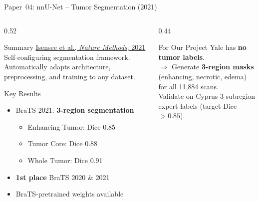 \documentclass[aspectratio=169,xcolor=dvipsnames]{beamer}
\begin{document}
\begin{frame}{Paper~04: nnU-Net -- Tumor Segmentation (2021)}
    \begin{columns}
        \begin{column}{0.52\textwidth}
            \begin{block}{Summary}
                \small
                \href{https://doi.org/10.1038/s41592-020-01008-z}{Isensee et al., \textit{Nature Methods}, 2021}\\[0.3em]
                Self-configuring segmentation framework. Automatically adapts architecture, preprocessing, and training to any dataset.
            \end{block}

            \vspace{0.2em}

            \begin{block}{Key Results}
                \small
                \begin{itemize}
                    \item BraTS 2021: \textbf{3-region segmentation}
                        \begin{itemize}
                            \scriptsize
                            \item Enhancing Tumor: Dice 0.85
                            \item Tumor Core: Dice 0.88
                            \item Whole Tumor: Dice 0.91
                        \end{itemize}
                    \item \textbf{1st place} BraTS 2020 \& 2021
                    \item BraTS-pretrained weights available
                \end{itemize}
            \end{block}
        \end{column}

        \begin{column}{0.44\textwidth}
            \begin{alertblock}{For Our Project}
                \small
                Yale has \textbf{no tumor labels}.\\
                $\Rightarrow$ Generate \textbf{3-region masks} (enhancing, necrotic, edema) for all 11,884 scans.\\[0.3em]
                Validate on Cyprus 3-subregion expert labels (target Dice $>0.85$).
            \end{alertblock}


\end{column}
\end{columns}
\end{frame}
\end{document}
